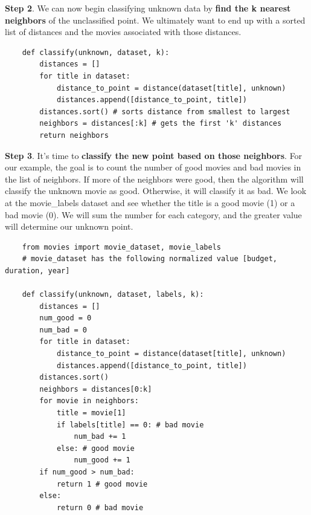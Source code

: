 \documentclass[11pt, a4paper]{article}
\begin{document}
\begin{spacing}{1.1}
	\noindent \textbf{Step 2}. We can now begin classifying unknown data by \textbf{find the k nearest neighbors} of the unclassified point. We ultimately want to end up with a sorted list of distances and the movies associated with those distances.
	\begin{lstlisting}
	def classify(unknown, dataset, k):
		distances = []
		for title in dataset:
			distance_to_point = distance(dataset[title], unknown)
			distances.append([distance_to_point, title])
		distances.sort() # sorts distance from smallest to largest
		neighbors = distances[:k] # gets the first 'k' distances
		return neighbors \end{lstlisting}\vspace*{1mm}
	\textbf{Step 3}. It's time to \textbf{classify the new point based on those neighbors}. For our example, the goal is to count the number of good movies and bad movies in the list of neighbors. If more of the neighbors were good, then the algorithm will classify the unknown movie as good. Otherwise, it will classify it as bad. We look at the movie\_labels dataset and see whether the title is a good movie (1) or a bad movie (0). We will sum the number for each category, and the greater value will determine our unknown point. 
	\begin{lstlisting}
	from movies import movie_dataset, movie_labels
	# movie_dataset has the following normalized value [budget, duration, year]
	
	def classify(unknown, dataset, labels, k):
		distances = []
		num_good = 0
		num_bad = 0
		for title in dataset:
			distance_to_point = distance(dataset[title], unknown)
			distances.append([distance_to_point, title])
		distances.sort()
		neighbors = distances[0:k]
		for movie in neighbors:
			title = movie[1]
			if labels[title] == 0: # bad movie
				num_bad += 1
			else: # good movie
				num_good += 1
		if num_good > num_bad:
			return 1 # good movie
		else:
			return 0 # bad movie
	

\end{lstlisting}
\end{spacing}
\end{document}

